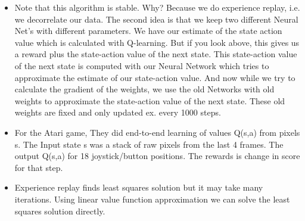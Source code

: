 \documentclass[a4paper]{article}
\begin{document}
\begin{itemize}
    \item Note that this algorithm is stable. Why? Because we do experience replay, i.e. we decorrelate our data. The second idea is that we keep two different Neural Net's with different parameters. We have our estimate of the state action value which is calculated with Q-learning. But if you look above, this gives us a reward plus the state-action value of the next state. This state-action value of the next state is computed with our Neural Network which tries to approximate the estimate of our state-action value. And now while we try to calculate the gradient of the weights, we use the old Networks with old weights to approximate the state-action value of the next state. These old weights are fixed and only updated ex. every 1000 steps. 
    \item For the Atari game, They did end-to-end learning  of values Q(s,a) from pixels s. The Input state s was a stack of raw pixels from the last 4 frames. The output Q(s,a) for 18 joystick/button positions. The rewards is change in score for that step. 
    \item Experience replay finds least squares solution but it may take many iterations. Using linear value function approximation we can solve the least squares solution directly. 
\end{itemize}
\end{document}
